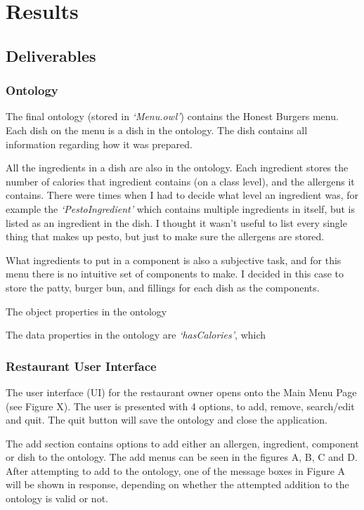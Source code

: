 \chapter{Results}

\section{Deliverables}

\subsection{Ontology}

The final ontology (stored in \textit{`Menu.owl'}) contains the Honest Burgers menu. Each dish on the menu is a dish in the ontology. The dish contains all information regarding how it was prepared.

All the ingredients in a dish are also in the ontology. Each ingredient stores the number of calories that ingredient contains (on a class level), and the allergens it contains. There were times when I had to decide what level an ingredient was, for example the \textit{`PestoIngredient'} which contains multiple ingredients in itself, but is listed as an ingredient in the dish. I thought it wasn't useful to list every single thing that makes up pesto, but just to make sure the allergens are stored. 

What ingredients to put in a component is also a subjective task, and for this menu there is no intuitive set of components to make. I decided in this case to store the patty, burger bun, and fillings for each dish as the components.

The object properties in the ontology

The data properties in the ontology are \textit{`hasCalories'}, which 



\subsection{Restaurant User Interface}

The user interface (UI) for the restaurant owner opens onto the Main Menu Page (see Figure X). The user is presented with 4 options, to add, remove, search/edit and quit. The quit button will save the ontology and close the application.

The add section contains options to add either an allergen, ingredient, component or dish to the ontology. The add menus can be seen in the figures A, B, C and D. After attempting to add to the ontology, one of the message boxes in Figure A will be shown in response, depending on whether the attempted addition to the ontology is valid or not.

